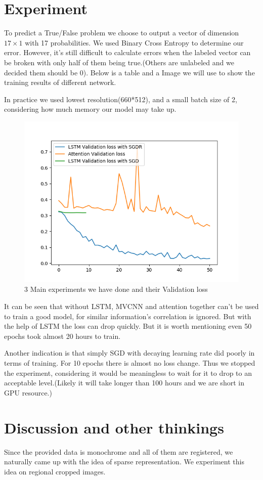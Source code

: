 \documentclass[conference,compsoc]{IEEEtran}
\begin{document}
\section{Experiment}
To predict a True/False problem we choose to output a vector of dimension $17 \times 1$ with 17 probabilities.
We used Binary Cross Entropy to determine our error. However, it's still difficult to calculate errors when the labeled vector can be broken with only half of them being true.(Others are unlabeled and we decided them should be 0).
Below is a table and a Image we will use to show the training results of different network.
\par In practice we used lowest resolution(660*512), and a small batch size of 2, considering how much memory our model may take up.
\begin{figure}[!tp]
	\includegraphics[width=.5\textwidth]{../Pic/3models}
	\caption{3 Main experiments we have done and their Validation loss}
\end{figure}
\par
It can be seen that without LSTM, MVCNN and attention together can't be used to train a good model, for similar information's correlation is ignored. But with the help of LSTM the loss can drop quickly. But it is worth mentioning even 50 epochs took almost 20 hours to train.
\par
Another indication is that simply SGD with decaying learning rate did poorly in terms of training. For 10 epochs there is almost no loss change. Thus we stopped the experiment, considering it would be meaningless to wait for it to drop to an acceptable level.(Likely it will take longer than 100 hours and we are short in GPU resource.)

\section{Discussion and other thinkings}
Since the provided data is monochrome and all of them are registered, we naturally came up with the idea of sparse representation. We experiment this idea on regional cropped images.
\end{document}
